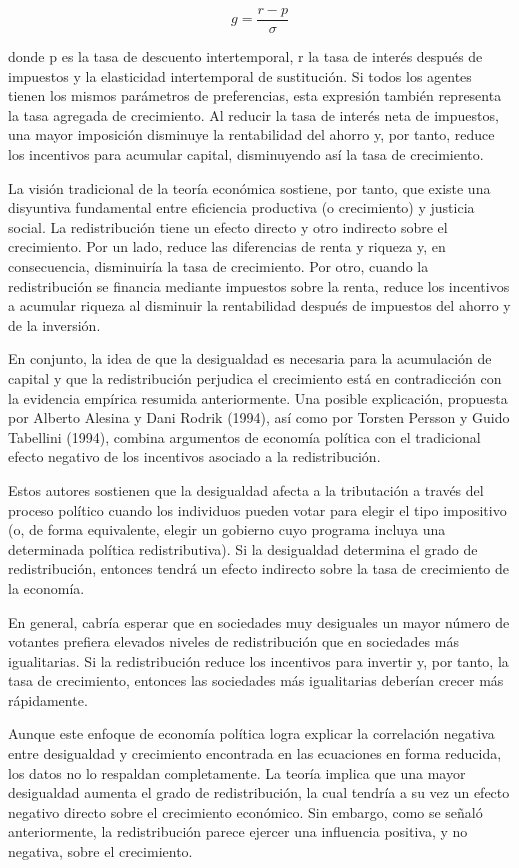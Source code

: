 \documentclass[10pt,a4paper]{article}
\begin{document}
$$g=\frac{r-p}{\sigma}$$

donde p es la tasa de descuento intertemporal, r la tasa de interés después de impuestos y \sigma la elasticidad intertemporal de sustitución. Si todos los agentes tienen los mismos parámetros de preferencias, esta expresión también representa la tasa agregada de crecimiento. Al reducir la tasa de interés neta de impuestos, una mayor imposición disminuye la rentabilidad del ahorro y, por tanto, reduce los incentivos para acumular capital, disminuyendo así la tasa de crecimiento.

La visión tradicional de la teoría económica sostiene, por tanto, que existe una disyuntiva fundamental entre eficiencia productiva (o crecimiento) y justicia social. La redistribución tiene un efecto directo y otro indirecto sobre el crecimiento. Por un lado, reduce las diferencias de renta y riqueza y, en consecuencia, disminuiría la tasa de crecimiento. Por otro, cuando la redistribución se financia mediante impuestos sobre la renta, reduce los incentivos a acumular riqueza al disminuir la rentabilidad después de impuestos del ahorro y de la inversión.

En conjunto, la idea de que la desigualdad es necesaria para la acumulación de capital y que la redistribución perjudica el crecimiento está en contradicción con la evidencia empírica resumida anteriormente. Una posible explicación, propuesta por Alberto Alesina y Dani Rodrik (1994), así como por Torsten Persson y Guido Tabellini (1994), combina argumentos de economía política con el tradicional efecto negativo de los incentivos asociado a la redistribución.

Estos autores sostienen que la desigualdad afecta a la tributación a través del proceso político cuando los individuos pueden votar para elegir el tipo impositivo (o, de forma equivalente, elegir un gobierno cuyo programa incluya una determinada política redistributiva). Si la desigualdad determina el grado de redistribución, entonces tendrá un efecto indirecto sobre la tasa de crecimiento de la economía.

En general, cabría esperar que en sociedades muy desiguales un mayor número de votantes prefiera elevados niveles de redistribución que en sociedades más igualitarias. Si la redistribución reduce los incentivos para invertir y, por tanto, la tasa de crecimiento, entonces las sociedades más igualitarias deberían crecer más rápidamente.

Aunque este enfoque de economía política logra explicar la correlación negativa entre desigualdad y crecimiento encontrada en las ecuaciones en forma reducida, los datos no lo respaldan completamente. La teoría implica que una mayor desigualdad aumenta el grado de redistribución, la cual tendría a su vez un efecto negativo directo sobre el crecimiento económico. Sin embargo, como se señaló anteriormente, la redistribución parece ejercer una influencia positiva, y no negativa, sobre el crecimiento.
\end{document}
